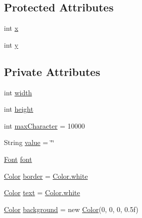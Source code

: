 \subsection*{Protected Attributes}
\begin{DoxyCompactItemize}
\item 
int \mbox{\hyperlink{classorg_1_1newdawn_1_1slick_1_1gui_1_1_text_field_a05dd91af6b1552f194c1aadbdf894c8c}{x}}
\item 
int \mbox{\hyperlink{classorg_1_1newdawn_1_1slick_1_1gui_1_1_text_field_acb0df9f048eabd20f6d5d40799b48706}{y}}
\end{DoxyCompactItemize}
\subsection*{Private Attributes}
\begin{DoxyCompactItemize}
\item 
int \mbox{\hyperlink{classorg_1_1newdawn_1_1slick_1_1gui_1_1_text_field_aa0b76a23e9820ca0c01294f8de515b8e}{width}}
\item 
int \mbox{\hyperlink{classorg_1_1newdawn_1_1slick_1_1gui_1_1_text_field_ad3a2b3a6afaee86e3c3a186b79a49564}{height}}
\item 
int \mbox{\hyperlink{classorg_1_1newdawn_1_1slick_1_1gui_1_1_text_field_a51e223641f99aad33d859574bc6b2722}{max\+Character}} = 10000
\item 
String \mbox{\hyperlink{classorg_1_1newdawn_1_1slick_1_1gui_1_1_text_field_a23c571aa0aa30ccbc28a090a06a444b7}{value}} = \char`\"{}\char`\"{}
\item 
\mbox{\hyperlink{interfaceorg_1_1newdawn_1_1slick_1_1_font}{Font}} \mbox{\hyperlink{classorg_1_1newdawn_1_1slick_1_1gui_1_1_text_field_af54f063de3967c819706c514a27fdf12}{font}}
\item 
\mbox{\hyperlink{classorg_1_1newdawn_1_1slick_1_1_color}{Color}} \mbox{\hyperlink{classorg_1_1newdawn_1_1slick_1_1gui_1_1_text_field_a6a2e66c20955c3523577a527524b6227}{border}} = \mbox{\hyperlink{classorg_1_1newdawn_1_1slick_1_1_color_afcd91cbdd26233d226d734f70dca3d2e}{Color.\+white}}
\item 
\mbox{\hyperlink{classorg_1_1newdawn_1_1slick_1_1_color}{Color}} \mbox{\hyperlink{classorg_1_1newdawn_1_1slick_1_1gui_1_1_text_field_af66b269abe9cd0edb7ecb3f492031565}{text}} = \mbox{\hyperlink{classorg_1_1newdawn_1_1slick_1_1_color_afcd91cbdd26233d226d734f70dca3d2e}{Color.\+white}}
\item 
\mbox{\hyperlink{classorg_1_1newdawn_1_1slick_1_1_color}{Color}} \mbox{\hyperlink{classorg_1_1newdawn_1_1slick_1_1gui_1_1_text_field_aea206c1ce4a086e7ade6b92a9bca9342}{background}} = new \mbox{\hyperlink{classorg_1_1newdawn_1_1slick_1_1_color}{Color}}(0, 0, 0, 0.\+5f)

\end{DoxyCompactItemize}

